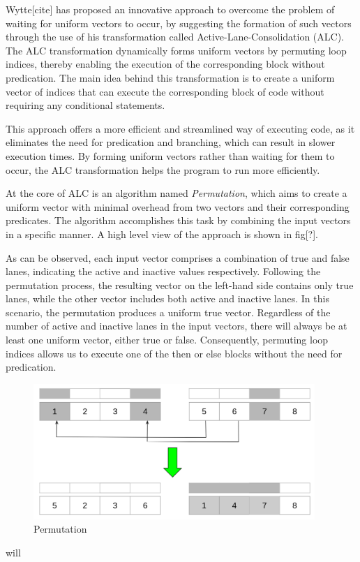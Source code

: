 \documentclass[\main/thesis.tex]{subfiles}
\begin{document}
Wytte[cite] has proposed an innovative approach to overcome the problem of waiting for uniform vectors to occur, by suggesting the formation of such vectors through the use of his transformation called Active-Lane-Consolidation (ALC). The ALC transformation dynamically forms uniform vectors by permuting loop indices, thereby enabling the execution of the corresponding block without predication. The main idea behind this transformation is to create a uniform vector of indices that can execute the corresponding block of code without requiring any conditional statements.

This approach offers a more efficient and streamlined way of executing code, as it eliminates the need for predication and branching, which can result in slower execution times. By forming uniform vectors rather than waiting for them to occur, the ALC transformation helps the program to run more efficiently.

At the core of ALC is an algorithm named \emph{Permutation}, which aims to create a uniform vector with minimal overhead from two vectors and their corresponding predicates. The algorithm accomplishes this task by combining the input vectors in a specific manner. A high level view of the approach is shown in fig[?].

As can be observed, each input vector comprises a combination of true and false lanes, indicating the active and inactive values respectively. Following the permutation process, the resulting vector on the left-hand side contains only true lanes, while the other vector includes both active and inactive lanes. In this scenario, the permutation produces a uniform true vector. Regardless of the number of active and inactive lanes in the input vectors, there will always be at least one uniform vector, either true or false. Consequently, permuting loop indices allows us to execute one of the then or else blocks without the need for predication.


\begin{figure}[t!]
    \centering
    \includegraphics[width=0.95\textwidth]{img/permutation.png}
    \caption{Permutation}
    \label{fig:Permutation}
\end{figure}will
\end{document}
